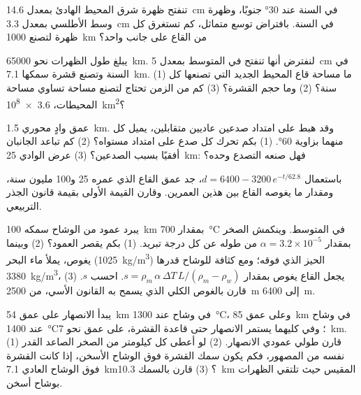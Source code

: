 \begin{exercise}[$\star\star$]\label{exo:g11:ocean-ridges:8}
تنفتح ظهرة شرق المحيط الهادئ بمعدل \qty{14.6}{cm} في السنة عند \ang{30} جنوبًا،
وظهرة وسط الأطلسي بمعدل \qty{3.3}{cm} في السنة. بافتراض توسع متماثل، كم
تستغرق كل ظهرة لتصنع \qty{1000}{km} من القاع على جانب واحد؟
\end{exercise}

\begin{exercise}[$\star\star$]\label{exo:g11:ocean-ridges:9}
يبلغ طول الظهرات نحو \qty{65000}{km}. لنفترض أنها تنفتح في المتوسط بمعدل
\qty{5}{cm} في السنة وتصنع قشرة سمكها \qty{7.1}{km}. (1) ما مساحة قاع
المحيط الجديد التي تصنعها كل سنة؟ (2) وما حجم القشرة؟ (3) كم من الزمن
تحتاج لتصنع مساحة تساوي مساحة المحيطات،
\qty{3.6e8}{km^2}؟
\end{exercise}

\begin{exercise}[$\star\star$]\label{exo:g11:ocean-ridges:10}
عمق وادٍ محوري \qty{1.5}{km}. وقد هبط على امتداد صدعين عاديين
متقابلين، يميل كل منهما بزاوية \ang{60}. (1) بكم تحرك كل صدع
على امتداد مستواه؟ (2) كم تباعد الجانبان أفقيًا
بسبب الصدعين؟ (3) عرض الوادي \qty{25}{km}: فهل صنعه التصدع
وحده؟
\end{exercise}

\begin{exercise}[$\star\star$]\label{exo:g11:ocean-ridges:11}
باستعمال $d = 6400 - 3200\,e^{-t/62.8}$، جد عمق القاع الذي عمره 25 و100
مليون سنة، ومقدار ما يغوصه القاع بين هذين العمرين. وقارن
القيمة الأولى بقيمة قانون الجذر التربيعي.
\end{exercise}

\begin{exercise}[$\star\star\star$]\label{exo:g11:ocean-ridges:12}
يبرد عمود من الوشاح سمكه \qty{100}{km} بمقدار \qty{700}{\celsius} في
المتوسط. وينكمش الصخر بمقدار $\alpha = 3.2 \times 10^{-5}$ من طوله عن
كل درجة تبريد. (1) بكم يقصر العمود؟ (2) وبينما
يغوص، يملأ ماء البحر (\qty{1025}{kg/m^3}) الحيز الذي فوقه؛ ومع كثافة
للوشاح قدرها \qty{3380}{kg/m^3}، يجعل  القاع يغوص بمقدار
$s = \rho_m\,\alpha\,\Delta T\,L/(\rho_m - \rho_w)$. احسب $s$. (3) قارن
بالغوص الكلي الذي يسمح به القانون الأسي، من \qty{2500}{m} إلى
\qty{6400}{m}.
\end{exercise}

\begin{exercise}[$\star\star\star$]\label{exo:g11:ocean-ridges:13}
يبدأ الانصهار على عمق \qty{54}{km} في وشاح عند \qty{1300}{\celsius}،
وعلى عمق \qty{85}{km} في وشاح عند \qty{1400}{\celsius}؛ وفي كليهما يستمر الانصهار
حتى قاعدة القشرة، على عمق نحو \qty{7}{km}. (1) قارن طولي
عمودي الانصهار. (2) لو أعطى كل كيلومتر من الصخر الصاعد القدر نفسه
من المصهور، فكم يكون سمك القشرة فوق الوشاح الأسخن، إذا كانت
القشرة فوق الوشاح العادي \qty{7.1}{km}؟ (3) قارن بالسمك \qty{10.3}{km}
المقيس حيث تلتقي الظهرات بوشاح أسخن.
\end{exercise}

